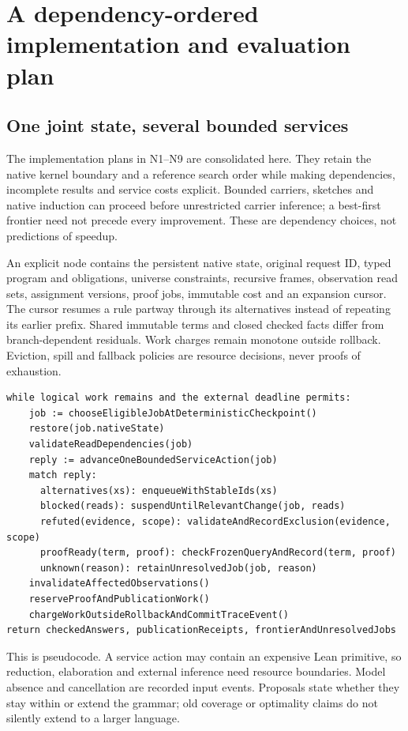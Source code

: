 \section{A dependency-ordered implementation and evaluation plan}\label{sec:roadmap}

\subsection{One joint state, several bounded services}

The implementation plans in N1--N9 are consolidated here. They retain the
native kernel boundary and a reference search order while making dependencies,
incomplete results and service costs explicit. Bounded carriers, sketches and
native induction can proceed before unrestricted carrier inference; a
best-first frontier need not precede every improvement. These are dependency
choices, not predictions of speedup.

An explicit node contains the persistent native state, original request ID,
typed program and obligations, universe constraints, recursive frames,
observation read sets, assignment versions, proof jobs, immutable cost and
an expansion cursor. The cursor resumes a rule partway through its alternatives
instead of repeating its earlier prefix. Shared immutable terms and closed
checked facts differ from branch-dependent residuals. Work charges remain
monotone outside rollback. Eviction, spill and fallback policies are resource
decisions, never proofs of exhaustion.

\begin{lstlisting}
while logical work remains and the external deadline permits:
    job := chooseEligibleJobAtDeterministicCheckpoint()
    restore(job.nativeState)
    validateReadDependencies(job)
    reply := advanceOneBoundedServiceAction(job)
    match reply:
      alternatives(xs): enqueueWithStableIds(xs)
      blocked(reads): suspendUntilRelevantChange(job, reads)
      refuted(evidence, scope): validateAndRecordExclusion(evidence, scope)
      proofReady(term, proof): checkFrozenQueryAndRecord(term, proof)
      unknown(reason): retainUnresolvedJob(job, reason)
    invalidateAffectedObservations()
    reserveProofAndPublicationWork()
    chargeWorkOutsideRollbackAndCommitTraceEvent()
return checkedAnswers, publicationReceipts, frontierAndUnresolvedJobs
\end{lstlisting}

This is pseudocode. A service action may contain an expensive Lean primitive,
so reduction, elaboration and external inference need resource boundaries.
Model absence and cancellation are recorded input events. Proposals state
whether they stay within or extend the grammar; old coverage or optimality
claims do not silently extend to a larger language.

